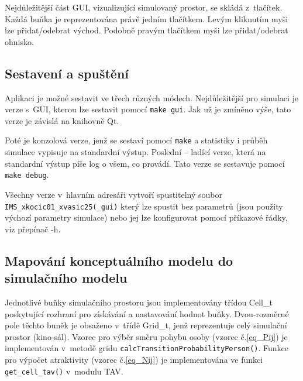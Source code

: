 \documentclass[11pt, titlepage, a4paper]{article}
\begin{document}
    Nejdůležitější část GUI, vizualizující simulovaný prostor, se skládá z~tlačítek. Každá buňka je reprezentována právě jedním tlačítkem. Levým kliknutím myši lze přidat/odebrat východ. Podobně pravým tlačítkem myši lze přidat/odebrat ohnisko.
    
    \subsection{Sestavení a spuštění}
    Aplikaci je možné sestavit ve třech různých módech.
    Nejdůležitější pro simulaci je verze s~GUI, kterou lze sestavit pomocí \texttt{make gui}. Jak už je zmíněno výše, tato verze je závislá na knihovně Qt.
    
    Poté je konzolová verze, jenž se sestaví pomocí \texttt{make} a statistiky i průběh simulace vypisuje na standardní výstup. Poslední -- ladící verze, která na standardní výstup píše log o všem, co provádí. Tato verze se sestavuje pomocí \texttt{make debug}.
    
    Všechny verze v~hlavním adresáři vytvoří spustitelný soubor \texttt{IMS\_xkocic01\_xvasic25(\_gui)} který lze spustit bez parametrů (jsou použity výchozí parametry simulace) nebo jej lze konfigurovat pomocí příkazové řádky, viz přepínač -h.

    \subsection{Mapování konceptuálního modelu do simulačního modelu}
    Jednotlivé buňky simulačního prostoru jsou implementovány třídou Cell\_t poskytující rozhraní pro získávání a nastavování hodnot buňky. Dvou-rozměrné pole těchto buněk je obsaženo v~třídě Grid\_t, jenž reprezentuje celý simulační prostor (kino-sál). Vzorec pro výběr směru pohybu osoby (vzorec č.\ref{eq_Pij}) je implementován v~metodě gridu \texttt{calcTransitionProbabilityPerson()}. Funkce pro výpočet atraktivity (vzorec č.\ref{eq_Nij}) je implementována ve funkci \texttt{get\_cell\_tav()} v~modulu TAV.
\end{document}
